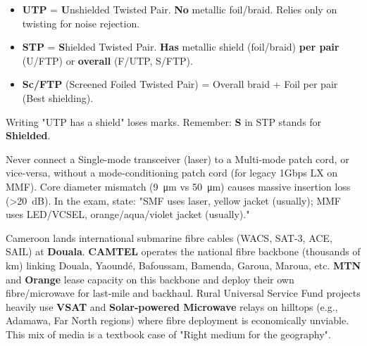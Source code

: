 \documentclass[11pt]{article}
\begin{document}
\begin{attention}
\begin{itemize}
\item \textbf{UTP} = \textbf{U}nshielded Twisted Pair. \textbf{No} metallic foil/braid. Relies only on twisting for noise rejection.
\item \textbf{STP} = \textbf{S}hielded Twisted Pair. \textbf{Has} metallic shield (foil/braid) \textbf{per pair} (U/FTP) or \textbf{overall} (F/UTP, S/FTP).
\item \textbf{Sc/FTP} (Screened Foiled Twisted Pair) = Overall braid + Foil per pair (Best shielding).
\end{itemize}
Writing "UTP has a shield" loses marks. Remember: \textbf{S} in STP stands for \textbf{Shielded}.
\end{attention}

\begin{attention}
Never connect a Single-mode transceiver (laser) to a Multi-mode patch cord, or vice-versa, without a mode-conditioning patch cord (for legacy 1Gbps LX on MMF). Core diameter mismatch (\SI{9}{\micro\meter} vs \SI{50}{\micro\meter}) causes massive insertion loss (\SI{>20}{dB}). In the exam, state: "SMF uses laser, yellow jacket (usually); MMF uses LED/VCSEL, orange/aqua/violet jacket (usually)."
\end{attention}

\begin{savaistu}
Cameroon lands international submarine fibre cables (WACS, SAT-3, ACE, SAIL) at \textbf{Douala}. \textbf{CAMTEL} operates the national fibre backbone (thousands of km) linking Douala, Yaoundé, Bafoussam, Bamenda, Garoua, Maroua, etc. \textbf{MTN} and \textbf{Orange} lease capacity on this backbone and deploy their own fibre/microwave for last-mile and backhaul. Rural Universal Service Fund projects heavily use \textbf{VSAT} and \textbf{Solar-powered Microwave} relays on hilltops (e.g., Adamawa, Far North regions) where fibre deployment is economically unviable. This mix of media is a textbook case of "Right medium for the geography".
\end{savaistu}
\end{document}
